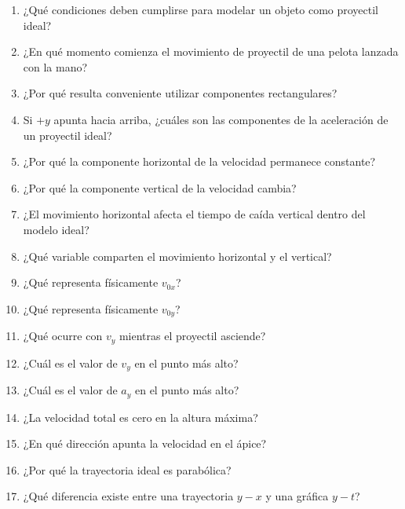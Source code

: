\begin{enumerate}
    \item ¿Qué condiciones deben cumplirse para modelar un objeto como proyectil
    ideal?

    \item ¿En qué momento comienza el movimiento de proyectil de una pelota lanzada
    con la mano?

    \item ¿Por qué resulta conveniente utilizar componentes rectangulares?

    \item Si \(+y\) apunta hacia arriba, ¿cuáles son las componentes de la
    aceleración de un proyectil ideal?

    \item ¿Por qué la componente horizontal de la velocidad permanece constante?

    \item ¿Por qué la componente vertical de la velocidad cambia?

    \item ¿El movimiento horizontal afecta el tiempo de caída vertical dentro del
    modelo ideal?

    \item ¿Qué variable comparten el movimiento horizontal y el vertical?

    \item ¿Qué representa físicamente \(v_{0x}\)?

    \item ¿Qué representa físicamente \(v_{0y}\)?

    \item ¿Qué ocurre con \(v_y\) mientras el proyectil asciende?

    \item ¿Cuál es el valor de \(v_y\) en el punto más alto?

    \item ¿Cuál es el valor de \(a_y\) en el punto más alto?

    \item ¿La velocidad total es cero en la altura máxima?

    \item ¿En qué dirección apunta la velocidad en el ápice?

    \item ¿Por qué la trayectoria ideal es parabólica?

    \item ¿Qué diferencia existe entre una trayectoria \(y-x\) y una gráfica
    \(y-t\)?


\end{enumerate}
